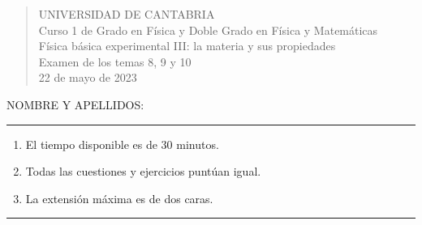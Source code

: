 \documentclass[11pt]{articulo}
\begin{document}
\begin{verse}
{\Large UNIVERSIDAD DE CANTABRIA}\\ 
\vspace*{0.5cm}
{\normalsize \rm Curso 1 de Grado en F\'isica y Doble Grado en F\'isica y Matem\'aticas}\\
{\normalsize \rm F\'isica b\'asica experimental III: la materia y sus propiedades}\\ 
{\normalsize \rm Examen de los temas 8, 9 y 10}\\
{\normalsize \rm 22 de mayo de 2023}\\
\end{verse} 

\vspace*{0.25cm}

NOMBRE Y APELLIDOS:\\

\vspace*{0.25cm}
 
\hrule
\begin{enumerate}
\item[] El tiempo disponible es de 30 minutos.
\item[] Todas las cuestiones y ejercicios punt\'uan igual.
\item[] La extensi\'on m\'axima es de dos caras.
\end{enumerate}
\hrule
          
\end{document}
